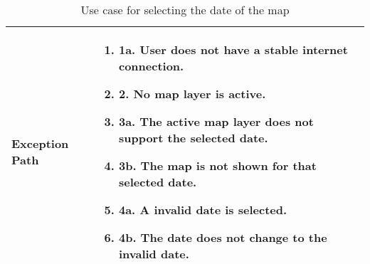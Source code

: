 \begin{table}[h]
\begin{tabularx}{\textwidth}{|l|X|}
        \hline
        \textbf{Exception Path} & 
        \begin{enumerate}[label=,left=0pt]
            \item 1a. User does not have a stable internet connection.
            \item 2. No map layer is active.
            \item 3a. The active map layer does not support the selected date.
            \item 3b. The map is not shown for that selected date.
            \item 4a. A invalid date is selected.
            \item 4b. The date does not change to the invalid date.
        \end{enumerate} \\
        \hline
    \end{tabularx}
    \caption*{Use case for selecting the date of the map}
    \label{tab:use_case_date_map_appendix}
\end{table}

